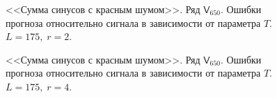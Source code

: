 \documentclass[specialist,
               substylefile = spbu.rtx,
               subf,href,colorlinks=true, 12p]{disser}
\begin{document}
\begin{figure}[H]
	\captionsetup{justification=centering}
	\caption{<<Сумма синусов с красным шумом>>. Ряд $\mathsf{V}_{650}$. Ошибки прогноза относительно сигнала в зависимости от параметра $T$. $L = 175, \; r = 2$.}
	\label{sigserr_r2}
\end{figure}

\begin{figure}[H]
	\captionsetup{justification=centering}
	\caption{<<Сумма синусов с красным шумом>>. Ряд $\mathsf{V}_{650}$. Ошибки прогноза относительно сигнала в зависимости от параметра $T$. $L = 175, \; r = 4$.}
	\label{sigserr_r4}
\end{figure}
\end{document}

